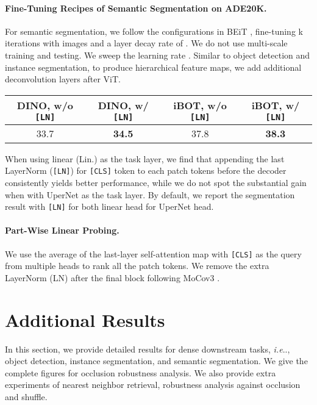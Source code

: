 \documentclass{article} \usepackage{iclr2022_conference,times}
\makeatletter
\def\ourmethod{{iBOT}\xspace}
\DeclareRobustCommand\onedot{\futurelet\@let@token\@onedot}
\def\@onedot{\ifx\@let@token.\else.\null\fi\xspace}
\def\ie{\emph{i.e}\onedot} \def\Ie{\emph{I.e}\onedot}
\makeatother
\begin{document}
\paragraph{Fine-Tuning Recipes of Semantic Segmentation on ADE20K.} 
For semantic segmentation, we follow the configurations in BEiT \citep{beit}, fine-tuning k iterations with  images and a layer decay rate of . 
We do not use multi-scale training and testing. 
We sweep the learning rate .
Similar to object detection and instance segmentation, to produce hierarchical feature maps, we add additional deconvolution layers after ViT.
\vspace{-0.3cm}
\begin{table}[H]
\centering
\begin{tabular}{cccc}
DINO, w/o \texttt{[LN]} & DINO, w/ \texttt{[LN]} & \ourmethod, w/o \texttt{[LN]} & \ourmethod, w/ \texttt{[LN]} \\
\toprule
33.7 & \bf 34.5  & 37.8 & \bf 38.3 \\
\end{tabular}
\end{table}
\vspace{-0.7cm}
When using linear (Lin.)  as the task layer, we find that appending the last LayerNorm (\texttt{[LN]}) for \texttt{[CLS]} token to each patch tokens before the decoder consistently yields better performance, while we do not spot the substantial gain when with UperNet as the task layer.
By default, we report the segmentation result with \texttt{[LN]} for both linear head for UperNet head.

\paragraph{Part-Wise Linear Probing.} We use the average of the last-layer self-attention map with \texttt{[CLS]} as the query from multiple heads to rank all the patch tokens. We remove the extra LayerNorm (LN) after the final block following MoCov3 \citep{mocov3}. 


\section{Additional Results}
\label{sec:addresult}

In this section, we provide detailed results for dense downstream tasks, \ie, object detection, instance segmentation, and semantic segmentation. We give the complete figures for occlusion robustness analysis. We also provide extra experiments of nearest neighbor retrieval, robustness analysis against occlusion and shuffle.
\end{document}
